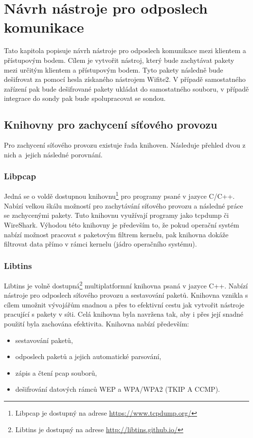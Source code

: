 \chapter{Návrh nástroje pro odposlech komunikace}
\label{navrh}
Tato kapitola popisuje návrh nástroje pro odposlech komunikace mezi klientem a přístupovým bodem. Cílem je vytvořit nástroj, který bude zachytávat pakety mezi určitým klientem a přístupovým bodem. Tyto pakety následně bude dešifrovat za pomocí hesla získaného nástrojem Wifite2. V případě samostatného zařízení pak bude dešifrované pakety ukládat do samostatného souboru, v případě integrace do sondy pak bude spolupracovat se sondou.

\section{Knihovny pro zachycení síťového provozu}
Pro zachycení síťového provozu existuje řada knihoven. Následuje přehled dvou z nich a~jejich následné porovnání.

\subsection{Libpcap}
Jedná se o voldě dostupnou knihovnu\footnote{Libpcap je dostupný na adrese \url{https://www.tcpdump.org/}} pro programy psané v jazyce C/C++. Nabízí velkou škálu možností pro zachytávání síťového provozu a následné práce se zachycenými pakety. Tuto knihovnu využívají programy jako tcpdump či WireShark. Výhodou této knihovny je především to, že pokud operační systém nabízí možnost pracovat s paketovým filtrem kernelu, pak knihovna dokáže filtrovat data přímo v rámci kernelu (jádro operačního systému). 

\subsection{Libtins}
Libtins je volně dostupná\footnote{Libtins je dostupný na adrese \url{http://libtins.github.io/}} multiplatformní knihovna psaná v jazyce C++. Nabízí nástroje pro odposlech síťového provozu a sestavování paketů. Knihovna vznikla s cílem umožnit vývojářům snadnou a přes to efektivní cestu jak vytvořit nástroje pracující s pakety v síti. Celá knihovna byla navržena tak, aby i přes její snadné použití byla zachována efektivita. Knihovna nabízí především:
\begin{itemize}
  \item{sestavování paketů,}
  \item{odposlech paketů a jejich automatické parsování,}
  \item{zápis a čtení pcap souborů,}
  \item{dešifrování datových rámců WEP a WPA/WPA2 (TKIP A CCMP).}
\end{itemize}

